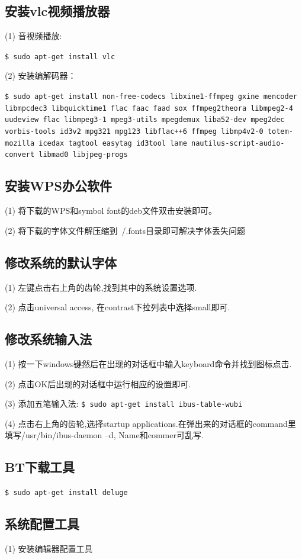 \subsection{安装vlc视频播放器}
(1) 音视频播放:

\verb"$ sudo apt-get install vlc"

(2) 安装编解码器：

\verb"$ sudo apt-get install non-free-codecs libxine1-ffmpeg gxine mencoder libmpcdec3 libquicktime1 flac faac faad sox ffmpeg2theora libmpeg2-4 uudeview flac libmpeg3-1 mpeg3-utils mpegdemux liba52-dev mpeg2dec vorbis-tools id3v2 mpg321 mpg123 libflac++6 ffmpeg libmp4v2-0 totem-mozilla icedax tagtool easytag id3tool lame nautilus-script-audio-convert libmad0 libjpeg-progs"

\subsection{安装WPS办公软件}
(1) 将下载的WPS和symbol font的deb文件双击安装即可。

(2) 将下载的字体文件解压缩到~/.fonts目录即可解决字体丢失问题

\subsection{修改系统的默认字体}
(1) 左键点击右上角的齿轮,找到其中的系统设置选项.

(2) 点击universal access, 在contrast下拉列表中选择small即可.

\subsection{修改系统输入法}
(1) 按一下windows键然后在出现的对话框中输入keyboard命令并找到图标点击.

(2) 点击OK后出现的对话框中运行相应的设置即可.

(3) 添加五笔输入法:
\verb"$ sudo apt-get install ibus-table-wubi"

(4) 点击右上角的齿轮,选择startup applications.在弹出来的对话框的command里填写/usr/bin/ibus-daemon –d, Name和commer可乱写.

\subsection{BT下载工具}
\verb"$ sudo apt-get install deluge"

\subsection{系统配置工具}
(1) 安装编辑器配置工具

